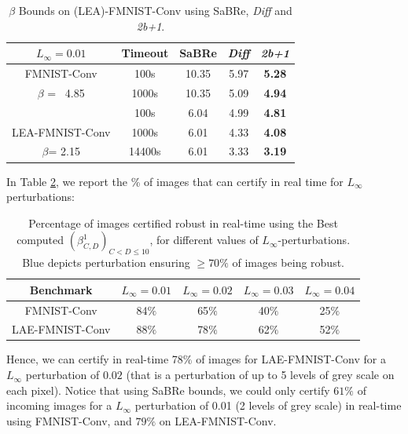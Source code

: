 \begin{table}[h!]
	\centering
	\begin{tabular}{|c c| c c c|}\hline
		$L_\infty=0.01$ & Timeout & SaBRe & {\em Diff} & {\em 2b+1} \\\hline \hline 
		FMNIST-Conv & 100s &  10.35  & 5.97 & {\bf 5.28}	\\
		\underline{$\beta$} = \, 4.85 & 1000s & 10.35 & 5.09 & 
		{\bf 4.94}	\\ \hline 
		 & 100s & 6.04 & 4.99 & {\bf 4.81}\\
		LEA-FMNIST-Conv & 1000s & 6.01 & 4.33 & {\bf 4.08} \\
		\underline{$\beta$}= 2.15 & 14400s & 6.01 & 3.33 & {\bf 3.19}\\ \hline 
	\end{tabular}
	\caption{$\beta$ Bounds on (LEA)-FMNIST-Conv using SaBRe, {\em Diff} and {\em 2b+1}.}
	\label{table5}
\end{table}





In Table \ref{table6}, we report the \% of images that can certify in real time for $L_{\infty}$ perturbations:

\begin{table}[h!]
	\centering
	\begin{tabular}{|c|cccc|}\hline
		Benchmark & $L_\infty=0.01$ & $L_\infty=0.02$ & $L_\infty=0.03$ & $L_\infty=0.04$
		
		\\ \hline 
		
 		FMNIST-Conv & 
		{\color{blue} 84$\%$}  & 65$\%$ & 40$\%$ &	25$\%$ 
		\\

		LAE-FMNIST-Conv & 
		{\color{blue} 88$\%$} &	{\color{blue}78$\%$} &	62$\%$ & 52$\%$  
		\\\hline
		
	\end{tabular}

	\caption{Percentage of images certified robust in real-time 
	using the Best computed $(\beta^{1}_{C,D})_{C < D \leq 10}$, 
	for different values of $L_\infty$-perturbations.
	{\color{blue} Blue} depicts perturbation ensuring 
	{\color{blue} $\geq 70\%$} of images being robust.}
    \label{table6}
\end{table}


Hence, we can certify in real-time 78$\%$ of images for LAE-FMNIST-Conv for a $L_\infty$ perturbation of $0.02$ (that is a perturbation of up to 5 levels of grey scale on each pixel). Notice that using SaBRe bounds, we could only certify $61\%$ of incoming images for a $L_\infty$ perturbation of 0.01 (2 levels of grey scale) in real-time using FMNIST-Conv, and $79\%$ on LEA-FMNIST-Conv.

